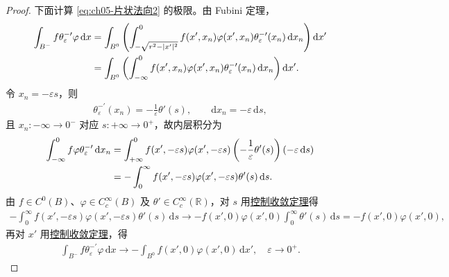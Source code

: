 \documentclass[../../main.tex]{subfiles}
\begin{document}
\begin{proof}
下面计算 \eqref{eq:ch05-片状法向2} 的极限。由 Fubini 定理，
\begin{align}
\int_{B^{-}}f\theta_{\varepsilon}^{-\prime}\varphi\,\mathrm{d}x
&=\int_{B^{0}}\left(\int_{-\sqrt{r^{2}-|x'|^{2}}}^{0}f(x',x_n)\varphi(x',x_n)\theta_{\varepsilon}^{-\prime}(x_n)\,\mathrm{d}x_n\right)\mathrm{d}x'
\notag\\
&=\int_{B^{0}}\left(\int_{-\infty}^{0}f(x',x_n)\varphi(x',x_n)\theta_{\varepsilon}^{-\prime}(x_n)\,\mathrm{d}x_n\right)\mathrm{d}x'.
\label{eq:ch05-法向负内层}
\end{align}
令 $x_n=-\varepsilon s$，则
\begin{align*}
\theta_{\varepsilon}^{-\prime}(x_n)=-\frac{1}{\varepsilon}\theta'(s),\qquad \mathrm{d}x_n=-\varepsilon\,\mathrm{d}s,
\end{align*}
且 $x_n:-\infty\to0^{-}$ 对应 $s:+\infty\to0^{+}$，故内层积分为
\begin{align}
\int_{-\infty}^{0}f\varphi\theta_{\varepsilon}^{-\prime}\,\mathrm{d}x_n
&=\int_{+\infty}^{0}f(x',-\varepsilon s)\varphi(x',-\varepsilon s)\left(-\frac{1}{\varepsilon}\theta'(s)\right)(-\varepsilon\,\mathrm{d}s)
\notag\\
&=-\int_{0}^{\infty}f(x',-\varepsilon s)\varphi(x',-\varepsilon s)\theta'(s)\,\mathrm{d}s.
\label{eq:ch05-法向负内层2}
\end{align}
由 $f\in C^{0}(B)$、$\varphi\in C_{c}^{\infty}(B)$ 及 $\theta'\in C_{c}^{\infty}(\mathbb{R})$，对 $s$ 用\hyperref[Real Analysis-theorem:控制收敛定理]{控制收敛定理}得
\begin{align*}
-\int_{0}^{\infty}f(x',-\varepsilon s)\varphi(x',-\varepsilon s)\theta'(s)\,\mathrm{d}s
\longrightarrow-f(x',0)\varphi(x',0)\int_{0}^{\infty}\theta'(s)\,\mathrm{d}s
=-f(x',0)\varphi(x',0),
\end{align*}
再对 $x'$ 用\hyperref[Real Analysis-theorem:控制收敛定理]{控制收敛定理}，得
\begin{align}
\int_{B^{-}}f\theta_{\varepsilon}^{-\prime}\varphi\,\mathrm{d}x
\longrightarrow-\int_{B^{0}}f(x',0)\varphi(x',0)\,\mathrm{d}x',\quad\varepsilon\to0^{+}.
\label{eq:ch05-法向负极限}
\end{align}


\end{proof}
\end{document}
